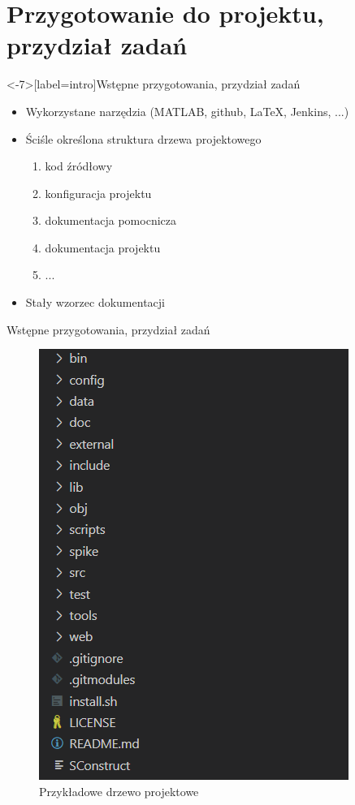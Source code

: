 \section{Przygotowanie do projektu, przydział zadań}
\label{podzial_zadan}

\begin{frame}<-7>[label=intro]{Wstępne przygotowania, przydział zadań}
    \centering
    \begin{itemize}
        \item<1-> Wykorzystane narzędzia (MATLAB, github, LaTeX, Jenkins, ...)
        \item<2-> Ściśle określona struktura drzewa projektowego
            \begin{enumerate}
                \item<3-> kod źródłowy
                \item<4-> konfiguracja projektu
                \item<5-> dokumentacja pomocnicza
                \item<6-> dokumentacja projektu
                \item<7-> ...
            \end{enumerate}
        \item<9-> Stały wzorzec dokumentacji
    \end{itemize} 
\end{frame}

\begin{frame}{Wstępne przygotowania, przydział zadań}
    \begin{figure}
        \centering
        \includegraphics[scale=0.5]{img/project_tree.png}
        \caption{Przykładowe drzewo projektowe}
    \end{figure}
\end{frame}

